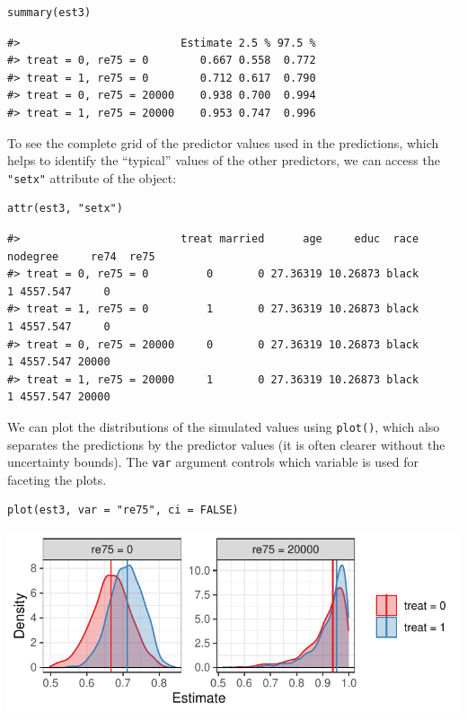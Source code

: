 \begin{verbatim}
summary(est3)
\end{verbatim}

\begin{verbatim}
#>                         Estimate 2.5 % 97.5 %
#> treat = 0, re75 = 0        0.667 0.558  0.772
#> treat = 1, re75 = 0        0.712 0.617  0.790
#> treat = 0, re75 = 20000    0.938 0.700  0.994
#> treat = 1, re75 = 20000    0.953 0.747  0.996
\end{verbatim}

To see the complete grid of the predictor values used in the predictions, which helps to identify the ``typical'' values of the other predictors, we can access the \texttt{"setx"} attribute of the object:

\begin{verbatim}
attr(est3, "setx")
\end{verbatim}

\begin{verbatim}
#>                         treat married      age     educ  race nodegree     re74  re75
#> treat = 0, re75 = 0         0       0 27.36319 10.26873 black        1 4557.547     0
#> treat = 1, re75 = 0         1       0 27.36319 10.26873 black        1 4557.547     0
#> treat = 0, re75 = 20000     0       0 27.36319 10.26873 black        1 4557.547 20000
#> treat = 1, re75 = 20000     1       0 27.36319 10.26873 black        1 4557.547 20000
\end{verbatim}

We can plot the distributions of the simulated values using \texttt{plot()}, which also separates the predictions by the predictor values (it is often clearer without the uncertainty bounds). The \texttt{var} argument controls which variable is used for faceting the plots.

\begin{verbatim}
plot(est3, var = "re75", ci = FALSE)
\end{verbatim}

\begin{center}\includegraphics{figures/plot3-1} \end{center}

